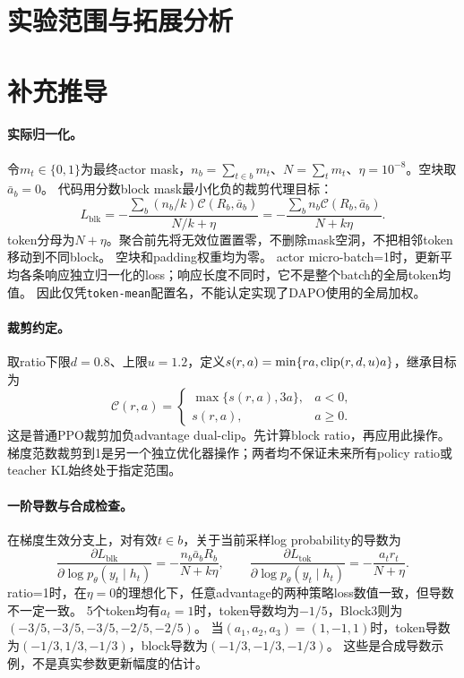 \section{实验范围与拓展分析}
\label{sec:limits}


\section{补充推导}
\label{app:proofs}
\paragraph{实际归一化。}
令$m_t\in\{0,1\}$为最终actor mask，$n_b=\sum_{t\in b}m_t$、$N=\sum_t m_t$、$\eta=10^{-8}$。空块取$\bar a_b=0$。
代码用分数block mask最小化负的裁剪代理目标：
\begin{equation}
 L_{\mathrm{blk}}=-\frac{\sum_b(n_b/k)\mathcal C(R_b,\bar a_b)}{N/k+\eta}
 =-\frac{\sum_b n_b\mathcal C(R_b,\bar a_b)}{N+k\eta}.
\end{equation}
token分母为$N+\eta$。聚合前先将无效位置置零，不删除mask空洞，不把相邻token移动到不同block。
空块和padding权重均为零。
actor micro-batch=1时，更新平均各条响应独立归一化的loss；响应长度不同时，它不是整个batch的全局token均值。
因此仅凭\texttt{token-mean}配置名，不能认定实现了DAPO使用的全局加权\citep{dapo}。

\paragraph{裁剪约定。}
取ratio下限$d=0.8$、上限$u=1.2$，定义$s(r,a)=\min\{ra,\operatorname{clip}(r,d,u)a\}$，继承目标为
\begin{equation}
 \mathcal C(r,a)=\begin{cases}\max\{s(r,a),3a\},&a<0,\\s(r,a),&a\ge0.\end{cases}
\end{equation}
这是普通PPO裁剪加负advantage dual-clip。先计算block ratio，再应用此操作。
梯度范数裁剪到1是另一个独立优化器操作；两者均不保证未来所有policy ratio或teacher KL始终处于指定范围。

\paragraph{一阶导数与合成检查。}
在梯度生效分支上，对有效$t\in b$，关于当前采样log probability的导数为
\begin{equation}
 \frac{\partial L_{\mathrm{blk}}}{\partial\log p_\theta(y_t\mid h_t)}
 =-\frac{n_b\bar a_bR_b}{N+k\eta},\qquad
 \frac{\partial L_{\mathrm{tok}}}{\partial\log p_\theta(y_t\mid h_t)}
 =-\frac{a_tr_t}{N+\eta}.
\end{equation}
ratio=1时，在$\eta=0$的理想化下，任意advantage的两种策略loss数值一致，但导数不一定一致。
5个token均有$a_t=1$时，token导数均为$-1/5$，Block3则为$(-3/5,-3/5,-3/5,-2/5,-2/5)$。
当$(a_1,a_2,a_3)=(1,-1,1)$时，token导数为$(-1/3,1/3,-1/3)$，block导数为$(-1/3,-1/3,-1/3)$。
这些是合成导数示例，不是真实参数更新幅度的估计。

